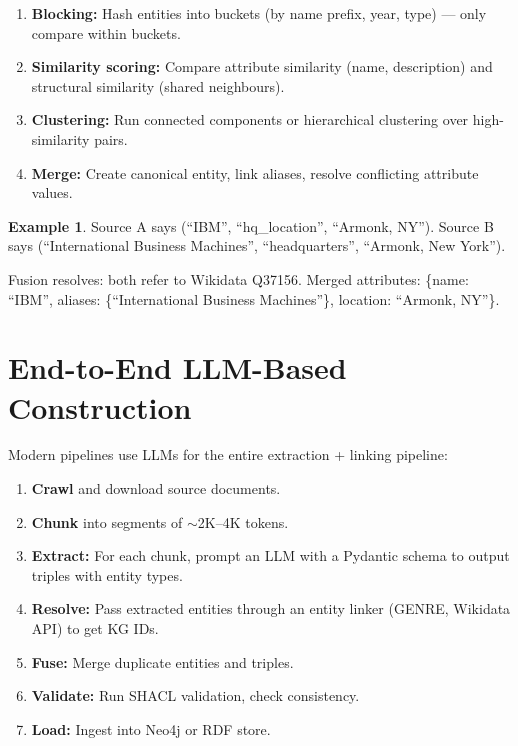 \documentclass[11pt,a4paper,oneside,openany]{book}
\theoremstyle{definition}
\newtheorem{example}{Example}[chapter]
\theoremstyle{plain}
\theoremstyle{remark}
\begin{document}
\begin{enumerate}
	\item \textbf{Blocking:} Hash entities into buckets (by name prefix, year, type) --- only compare within buckets.
	\item \textbf{Similarity scoring:} Compare attribute similarity (name, description) and structural similarity (shared neighbours).
	\item \textbf{Clustering:} Run connected components or hierarchical clustering over high-similarity pairs.
	\item \textbf{Merge:} Create canonical entity, link aliases, resolve conflicting attribute values.
\end{enumerate}

\begin{example}
	Source A says (``IBM'', ``hq\_location'', ``Armonk, NY'').
	Source B says (``International Business Machines'', ``headquarters'', ``Armonk, New York'').

	Fusion resolves: both refer to Wikidata Q37156. Merged attributes: \{name: ``IBM'', aliases: \{``International Business Machines''\}, location: ``Armonk, NY''\}.
\end{example}

\section{End-to-End LLM-Based Construction}\label{sec:llm-construction}

Modern pipelines use LLMs for the entire extraction + linking pipeline:

\begin{enumerate}
	\item \textbf{Crawl} and download source documents.
	\item \textbf{Chunk} into segments of $\sim$2K--4K tokens.
	\item \textbf{Extract:} For each chunk, prompt an LLM with a Pydantic schema to output triples with entity types.
	\item \textbf{Resolve:} Pass extracted entities through an entity linker (GENRE, Wikidata API) to get KG IDs.
	\item \textbf{Fuse:} Merge duplicate entities and triples.
	\item \textbf{Validate:} Run SHACL validation, check consistency.
	\item \textbf{Load:} Ingest into Neo4j or RDF store.
\end{enumerate}
\end{document}
